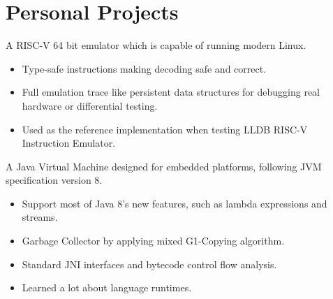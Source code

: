 \documentclass{resume}
\begin{document}

\section{Personal Projects}
A RISC-V 64 bit emulator which is capable of running modern Linux.
\begin{itemize}
  \item Type-safe instructions making decoding safe and correct.
  \item Full emulation trace like persistent data structures for debugging real hardware or differential testing.
  \item Used as the reference implementation when testing LLDB RISC-V Instruction Emulator.
\end{itemize}

A Java Virtual Machine designed for embedded platforms, following JVM specification version 8.
\begin{itemize}
  \item Support most of Java 8's new features, such as lambda expressions and streams.
  \item Garbage Collector by applying mixed G1-Copying algorithm.
  \item Standard JNI interfaces and bytecode control flow analysis.
  \item Learned a lot about language runtimes.
\end{itemize}

\end{document}

